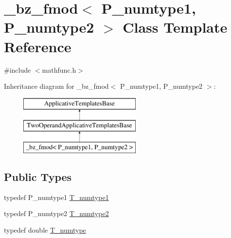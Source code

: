 \hypertarget{class__bz__fmod}{}\section{\+\_\+bz\+\_\+fmod$<$ P\+\_\+numtype1, P\+\_\+numtype2 $>$ Class Template Reference}
\label{class__bz__fmod}


{\ttfamily \#include $<$mathfunc.\+h$>$}

Inheritance diagram for \+\_\+bz\+\_\+fmod$<$ P\+\_\+numtype1, P\+\_\+numtype2 $>$\+:\begin{figure}[H]
\begin{center}
\leavevmode
\includegraphics[height=3.000000cm]{class__bz__fmod}
\end{center}
\end{figure}
\subsection*{Public Types}
\begin{DoxyCompactItemize}
\item 
typedef P\+\_\+numtype1 \hyperlink{class__bz__fmod_a07f37189d3725953692a5a02ec49a8b0}{T\+\_\+numtype1}
\item 
typedef P\+\_\+numtype2 \hyperlink{class__bz__fmod_a6e0f754063c23e1a96a6c9fb90582e35}{T\+\_\+numtype2}
\item 
typedef double \hyperlink{class__bz__fmod_a8c47d5a70c382ccce460c68292c01c6a}{T\+\_\+numtype}
\end{DoxyCompactItemize}
